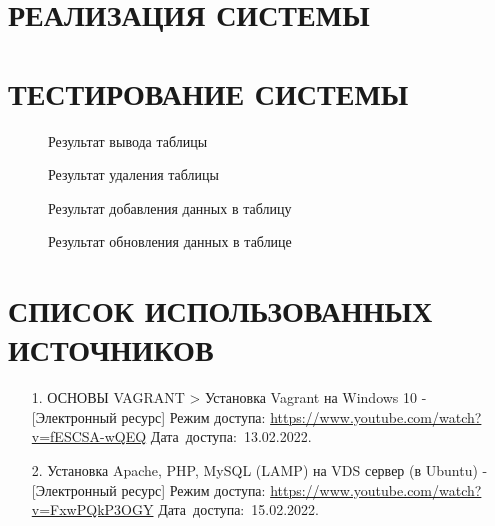 \documentclass[12pt, a4paper, simple]{eskdtext}
\begin{document}
    \newpage

    \section{РЕАЛИЗАЦИЯ СИСТЕМЫ}
    \newpage

    \section{ТЕСТИРОВАНИЕ СИСТЕМЫ}

    \begin{figure}[!h]
        \centering
        \caption{Результат вывода таблицы}
    \end{figure}

    \begin{figure}[!h]
        \centering
        \caption{Результат удаления таблицы}
    \end{figure}

    \begin{figure}[!h]
        \centering
        \caption{Результат добавления данных в таблицу}
    \end{figure}

    \begin{figure}[!h]
        \centering
        \caption{Результат обновления данных в таблице}
    \end{figure}

    \newpage

    \newpage
    \section*{СПИСОК ИСПОЛЬЗОВАННЫХ ИСТОЧНИКОВ}
    \begin{enumerate}
        \item[1.] ОСНОВЫ VAGRANT > Установка Vagrant на Windows 10 - [Электронный ресурс]
        Режим доступа: \url{https://www.youtube.com/watch?v=fESCSA-wQEQ}
        Дата~доступа:~13.02.2022.
        \item[2.] Установка Apache, PHP, MySQL (LAMP) на VDS сервер (в Ubuntu) - [Электронный ресурс]
        Режим доступа: \url{https://www.youtube.com/watch?v=FxwPQkP3OGY}
        Дата~доступа:~15.02.2022.
    \end{enumerate}
    \newpage
\end{document}
